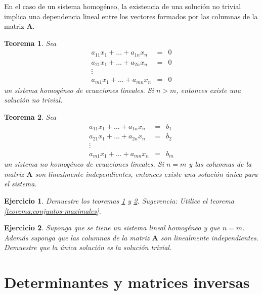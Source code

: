 \documentclass[11pt]{report}
\theoremstyle{break}
\newtheorem{teorema}{Teorema}[chapter]
\newtheorem{ejercicio}{Ejercicio}[chapter]
\theoremstyle{break}
\begin{document}
En el caso de un sistema homogéneo, la existencia de una solución no trivial implica una dependencia lineal entre los vectores formados por las columnas de la matriz $\bm{A}.$
 
\begin{teorema}
\label{teorema:solucion-no-triv-sist-hom}
Sea 
$$
\begin{array}{rcl}
a_{11}x_1 + \ldots + a_{1n}x_n & = & 0 \\
a_{21}x_1 + \ldots + a_{2n}x_n & = & 0 \\
\vdots &  &  \\
a_{m1}x_1 + \ldots + a_{mn}x_n & = & 0
\end{array}
$$
un sistema homogéneo de ecuaciones lineales. Si $n>m$, entonces existe una solución no trivial.
\end{teorema}

\begin{teorema}
\label{teorema:solucion-unica-sist-no-hom}
Sea 
$$
\begin{array}{rcl}
a_{11}x_1 + \ldots + a_{1n}x_n & = & b_1 \\
a_{21}x_1 + \ldots + a_{2n}x_n & = & b_2 \\
\vdots &  &  \\
a_{m1}x_1 + \ldots + a_{mn}x_n & = & b_m
\end{array}
$$
un sistema no homogéneo de ecuaciones lineales. Si $n=m$ y las columnas de la matriz $\bm{A}$ son linealmente independientes, entonces existe una solución única para el sistema.
\end{teorema}

\begin{ejercicio}
Demuestre los teoremas \ref{teorema:solucion-no-triv-sist-hom} y \ref{teorema:solucion-unica-sist-no-hom}.\newline
Sugerencia: Utilice el teorema \ref{teorema:conjuntos-maximales}.
\end{ejercicio}

\begin{ejercicio}
Suponga que se tiene un sistema lineal homogéneo y que $n = m$. Además suponga que las columnas de la matriz $\bm{A}$ son linealmente independientes. Demuestre que la única solución es la solución trivial.
\end{ejercicio}

\section{Determinantes y matrices inversas}
\label{seccion:determinantes-inversas}
\end{document}
